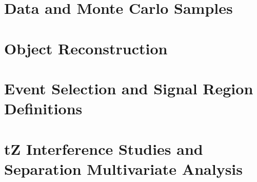 \documentclass[NOTE, atlasdraft=true, texlive=2016, UKenglish]{\ATLASLATEXPATH atlasdoc}
\begin{document}
%

\section{Data and Monte Carlo Samples}
\label{sec:data}


\section{Object Reconstruction}
\label{sec:obj}


\section{Event Selection and Signal Region Definitions}
\label{sec:evt_selection}


\section{tZ Interference Studies and Separation Multivariate Analysis}
\label{sec:tZ_bdt}


%
\end{document}
